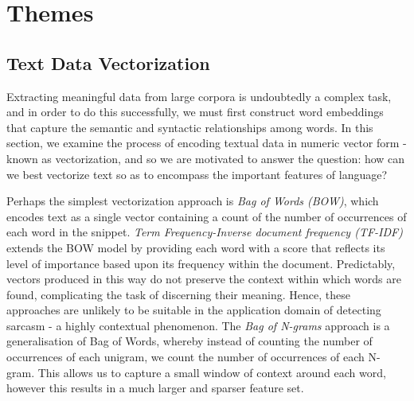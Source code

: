 \documentclass[12pt,a4paper]{article}
\begin{document}
\newpage

\section{Themes}

\subsection{Text Data Vectorization}
Extracting meaningful data from large corpora is undoubtedly a complex task, and in order to do this successfully, we must first construct word embeddings that capture the semantic and syntactic relationships among words. In this section, we examine the process of encoding textual data in numeric vector form - known as vectorization, and so we are motivated to answer the question: how can we best vectorize text so as to encompass the important features of language?\newline

Perhaps the simplest vectorization approach is \textit{Bag of Words (BOW)}, which encodes text as a single vector containing a count of the number of occurrences of each word in the snippet. \textit{Term Frequency-Inverse document frequency (TF-IDF)} \cite{robertson1976relevance} extends the BOW model by providing each word with a score that reflects its level of importance based upon its frequency within the document. Predictably, vectors produced in this way do not preserve the context within which words are found, complicating the task of discerning their meaning. Hence, these approaches are unlikely to be suitable in the application domain of detecting sarcasm - a highly contextual phenomenon. The \textit{Bag of N-grams} approach is a generalisation of Bag of Words, whereby instead of counting the number of occurrences of each unigram, we count the number of occurrences of each N-gram. This allows us to capture a small window of context around each word, however this results in a much larger and sparser feature set. \newline
\end{document}

